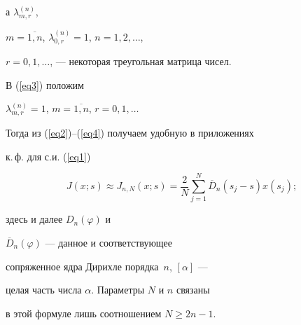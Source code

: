 а $\lambda_{m,r}^{(n)}$,


$m=\overline{1,n}$, $\lambda_{0,r}^{(n)}=1$, $n=1,2,\dotsc$,


$r=0,1,\dotsc$, --- некоторая треугольная матрица чисел.





В (\ref{eq3}) положим


$\lambda_{m,r}^{(n)}=1$, $m=\overline{1,n}$, $r=0,1,\dotsc$


Тогда из (\ref{eq2})--(\ref{eq4}) получаем удобную в приложениях


к.\,ф. для с.и. (\ref{eq1})


\begin{equation}\label{eq5}


J(x;s)\approx


J_{n,N}(x;s)=\frac{2}{N}\sum_{j=1}^N\overline{D}_n(s_j-s)x(s_j);


\end{equation}


здесь и далее $D_n(\varphi)$ и


$\overline{D}_n(\varphi)$ --- данное и соответствующее


сопряженное ядра Дирихле порядка~$n$, $[\alpha]$ ---


целая часть числа $\alpha$. Параметры $N$ и $n$ связаны


в этой формуле лишь соотношением $N\geq2n-1$.








